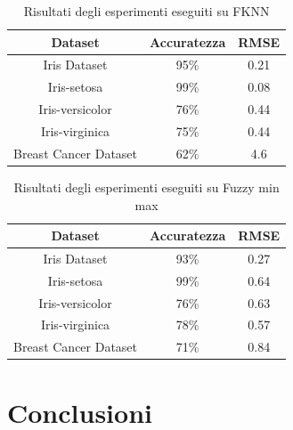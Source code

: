 \documentclass[oneside, openany]{book}
\begin{document}
	\begin{table}[h]
		\caption{Risultati degli esperimenti eseguiti su FKNN}
		\begin{center}\begin{tabular}{ |c|c|c| } 
				\hline
				Dataset & Accuratezza & RMSE\\
				\hline
				Iris Dataset& 95\% & 0.21 \\
				\hline
				Iris-setosa & 99\% & 0.08 \\
				\hline
				Iris-versicolor & 76\% & 0.44 \\
				\hline
				Iris-virginica & 75\% & 0.44 \\
				\hline
				Breast Cancer Dataset & 62\% & 4.6 \\
				\hline                  
			\end{tabular}
		\end{center}
		\label{tab:fknn}  
	\end{table}
	\begin{table}[h]
		\caption{Risultati degli esperimenti eseguiti su Fuzzy min max}
		\begin{center}\begin{tabular}{ |c|c|c| } 
				\hline
				Dataset & Accuratezza & RMSE\\
				\hline
				Iris Dataset& 93\% & 0.27 \\
				\hline
				Iris-setosa & 99\% & 0.64 \\
				\hline
				Iris-versicolor & 76\% & 0.63 \\
				\hline
				Iris-virginica & 78\% & 0.57 \\
				\hline
				Breast Cancer Dataset & 71\%  & 0.84 \\
				\hline                  
			\end{tabular}
		\end{center}
		\label{tab:fmm}  
	\end{table}
	\chapter*{Conclusioni}
	{}
\end{document}
